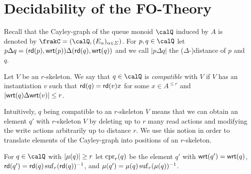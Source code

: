 \section{Decidability of the FO-Theory}
Recall that the Cayley-graph of the queue monoid $\Qx$ induced by $A$ is denoted by $\frakC=(\Qx,(E_\alpha)_{\alpha\in\Sigma})$.
For $p,q\in \Qx$ let $p\Delta q = (\mathsf{rd}(p), \mathsf{wrt}(p))\Delta (\mathsf{rd}(q), \mathsf{wrt}(q))$ and we call $|p\Delta q|$ the ($\Delta$-)distance of $p$ and $q$. 
\begin{definition}
	Let $V$ be an $r$-skeleton. We say that $q\in\Qx$ is \emph{compatible} with $V$ 
	if $V$ has an instantiation $v$ such that $\mathsf{rd}(q)= \mathsf{rd}(v)x$ for some $x\in A^{\leq r}$ and 
	$|\mathsf{wrt}(q) \Delta \mathsf{wrt}(v)| \leq r$.
\end{definition}
Intuitively, $q$ being compatible to an $r$-skeleton $V$ means that we can obtain an element
$q'$ with $r$-skeleton $V$ by deleting up to $r$ many read actions and modifying the write
actions arbitrarily up to distance $r$. We use this notion in order to translate elements of the Cayley-graph
into positions of an $r$-skeleton.

\begin{definition}
	For $q\in\Qx$ with $|\mu(q)| \geq r$ let $\operatorname{cpr}_r(q)$ be the element $q'$  with $\mathsf{wrt}(q') = \mathsf{wrt}(q)$, $\mathsf{rd}(q')=\mathsf{rd}(q)\operatorname{suf}_{r}({\mathsf{rd}(q)})^{-1}$, and $\mu(q') = \mu(q) \operatorname{suf}_{r}(\mu(q))^{-1}$.
\end{definition}

